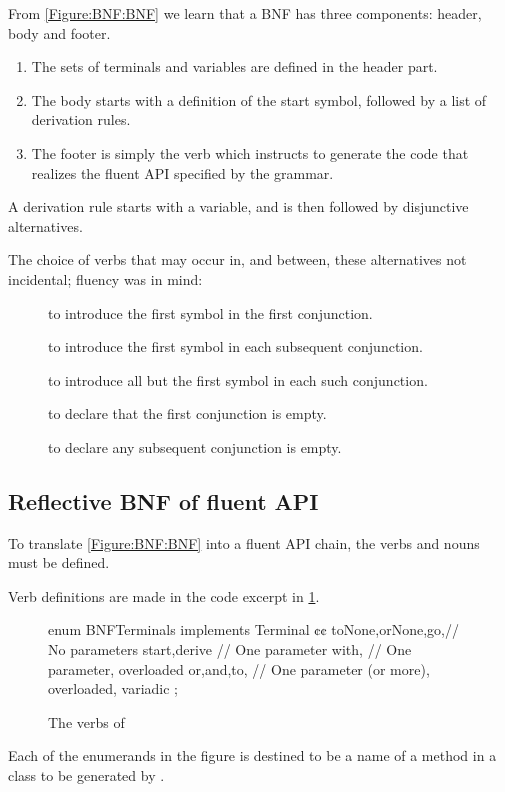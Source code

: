 From \cref{Figure:BNF:BNF} we learn
  that a BNF has three components: header, body and footer.
  \begin{enumerate}
    \item The sets of terminals and variables are defined in the header part.
    \item The body starts with a definition of the start symbol, followed by a list of derivation
  rules.
\item The footer is simply the verb  which instructs \Self
  to generate the code that realizes the fluent API specified by the grammar.
  \end{enumerate}

A derivation rule starts with a variable, and is then followed by disjunctive alternatives.

The choice of verbs that may occur in, and between, these alternatives not incidental;
  fluency was in mind:
\begin{description}
  \item[] to introduce the first symbol in the first conjunction.
  \item[] to introduce the first symbol in each subsequent conjunction.
  \item[] to introduce all but the first symbol in each such conjunction.
  \item[] to declare that the first conjunction is empty.
  \item[] to declare any subsequent conjunction is empty.
\end{description}

\subsection{Reflective BNF of fluent API}

To translate \cref{Figure:BNF:BNF} into a fluent
API chain, the verbs and nouns must be defined.

Verb definitions are made in the code excerpt in
\cref{Figure:Verbs}.

\begin{figure}[htb]
  \begin{JAVA}[style=code]
enum BNFTerminals implements Terminal {¢¢
  toNone,orNone,go,// No parameters
  start,derive     // One parameter
  with,            // One parameter, overloaded
  or,and,to,       // One parameter (or more), overloaded, variadic
  ;
}\end{JAVA}
  \caption{The verbs of \Self}
  \label{Figure:Verbs}
\end{figure}
Each of the enumerands in the figure is destined to be a
  name of a method in a class to be generated by \Self.

